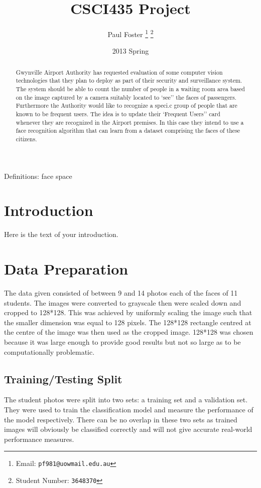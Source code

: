 \documentclass{article}
\begin{document}
\title{CSCI435 Project}
\author{Paul Foster
	\thanks{Email: \texttt{pf981@uowmail.edu.au}}
	\thanks{Student Number: \texttt{3648370}}}
\date{2013 Spring}

\maketitle

\renewcommand\abstractname{Executive Summary}
\begin{abstract}
Gwynville Airport Authority has requested evaluation of some computer vision
technologies that they plan to deploy as part of their security and surveillance system.
The system should be able to count the number of people in a waiting room area based
on the image captured by a camera suitably located to `see'' the faces of passengers. Furthermore the Authority would like to recognize a speci.c group of people that are known
to be frequent users. The idea is to update their `Frequent Users'' card whenever they
are recognized in the Airport premises. In this case they intend to use a face recognition
algorithm that can learn from a dataset comprising the faces of these citizens.
\end{abstract}

Definitions: face space

\section{Introduction}
Here is the text of your introduction.

\section{Data Preparation}
The data given consisted of between 9 and 14 photos each of the faces of 11 students. The images were converted to grayscale then were scaled down and cropped to 128*128. This was achieved by uniformly scaling the image such that the smaller dimension was equal to 128 pixels. The 128*128 rectangle centred at the centre of the image was then used as the cropped image. 128*128 was chosen because it was large enough to provide good results but not so large as to be computationally problematic.


\subsection{Training/Testing Split}
The student photos were split into two sets: a training set and a validation set. They were used to train the classification model and measure the performance of the model respectively. There can be no overlap in these two sets as trained images will obviously be classified correctly and will not give accurate real-world performance measures.
\end{document}
